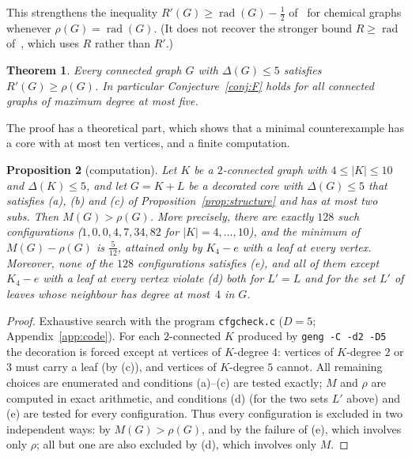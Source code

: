 \documentclass[11pt]{amsart}
\newtheorem{theorem}{Theorem}[section]
\newtheorem{proposition}[theorem]{Proposition}
\theoremstyle{definition}
\newcommand{\rad}{\operatorname{rad}}
\newcommand{\Rp}{R'}
\begin{document}
This strengthens the inequality $\Rp(G)\ge\rad(G)-\frac12$ of~\cite[Theorem~1.2]{CPS} for chemical graphs whenever
$\rho(G)=\rad(G)$. (It does not recover the stronger bound $R\ge\rad$ of~\cite[Theorem~1.3]{CPS}, which uses $R$
rather than $\Rp$.)

\begin{theorem}\label{thm:D5}
Every connected graph $G$ with $\Delta(G)\le5$ satisfies $\Rp(G)\ge\rho(G)$. In particular
Conjecture~\ref{conj:F} holds for all connected graphs of maximum degree at most five.
\end{theorem}

The proof has a theoretical part, which shows that a minimal counterexample has a core with at most ten vertices,
and a finite computation.

\begin{proposition}[computation]\label{prop:comp5}
Let $K$ be a $2$-connected graph with $4\le|K|\le10$ and $\Delta(K)\le5$, and let $G=K+L$ be a decorated core with
$\Delta(G)\le5$ that satisfies (a), (b) and (c) of Proposition~\ref{prop:structure} and has at most two subs. Then
$M(G)>\rho(G)$. More precisely, there are exactly $128$ such configurations ($1,0,0,4,7,34,82$ for
$|K|=4,\dots,10$), and the minimum of $M(G)-\rho(G)$ is $\frac5{12}$, attained only by $K_4-e$ with a leaf at every
vertex. Moreover, none of the $128$ configurations satisfies (e), and all of them except $K_4-e$ with a leaf at every
vertex violate (d) both for $L'=L$ and for the set $L'$ of leaves whose neighbour has degree at most~$4$ in $G$.
\end{proposition}

\begin{proof}
Exhaustive search with the program \texttt{cfgcheck.c} ($D=5$; Appendix~\ref{app:code}). For
each $2$-connected $K$ produced by \texttt{geng -C -d2 -D5} the decoration is forced except at vertices of
$K$-degree $4$: vertices of $K$-degree $2$ or $3$ must carry a leaf (by (c)), and vertices of $K$-degree $5$ cannot.
All remaining choices are enumerated and conditions (a)--(c) are tested exactly; $M$ and $\rho$ are computed in
exact arithmetic, and conditions (d) (for the two sets $L'$ above) and (e) are tested for every configuration. Thus
every configuration is excluded in two independent ways: by $M(G)>\rho(G)$, and by the failure of (e), which involves
only $\rho$; all but one are also excluded by (d), which involves only $M$.
\end{proof}
\end{document}

